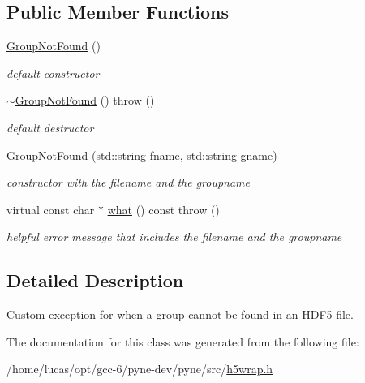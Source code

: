 \subsection*{Public Member Functions}
\begin{DoxyCompactItemize}
\item 
\hyperlink{classh5wrap_1_1_group_not_found_accc7d7bea9e86968335a46ee39d7d543}{Group\+Not\+Found} ()\hypertarget{classh5wrap_1_1_group_not_found_accc7d7bea9e86968335a46ee39d7d543}{}\label{classh5wrap_1_1_group_not_found_accc7d7bea9e86968335a46ee39d7d543}

\begin{DoxyCompactList}\small\item\em default constructor \end{DoxyCompactList}\item 
\hyperlink{classh5wrap_1_1_group_not_found_a79dea7d1d5e3ffd7a7e83b4a2636398a}{$\sim$\+Group\+Not\+Found} ()  throw ()\hypertarget{classh5wrap_1_1_group_not_found_a79dea7d1d5e3ffd7a7e83b4a2636398a}{}\label{classh5wrap_1_1_group_not_found_a79dea7d1d5e3ffd7a7e83b4a2636398a}

\begin{DoxyCompactList}\small\item\em default destructor \end{DoxyCompactList}\item 
\hyperlink{classh5wrap_1_1_group_not_found_a74f7e8f6efcf33503f5fec62eead40c3}{Group\+Not\+Found} (std\+::string fname, std\+::string gname)\hypertarget{classh5wrap_1_1_group_not_found_a74f7e8f6efcf33503f5fec62eead40c3}{}\label{classh5wrap_1_1_group_not_found_a74f7e8f6efcf33503f5fec62eead40c3}

\begin{DoxyCompactList}\small\item\em constructor with the filename and the groupname \end{DoxyCompactList}\item 
virtual const char $\ast$ \hyperlink{classh5wrap_1_1_group_not_found_a76766dc5fda0a07564379db454df87d0}{what} () const   throw ()\hypertarget{classh5wrap_1_1_group_not_found_a76766dc5fda0a07564379db454df87d0}{}\label{classh5wrap_1_1_group_not_found_a76766dc5fda0a07564379db454df87d0}

\begin{DoxyCompactList}\small\item\em helpful error message that includes the filename and the groupname \end{DoxyCompactList}\end{DoxyCompactItemize}


\subsection{Detailed Description}
Custom exception for when a group cannot be found in an H\+D\+F5 file. 

The documentation for this class was generated from the following file\+:\begin{DoxyCompactItemize}
\item 
/home/lucas/opt/gcc-\/6/pyne-\/dev/pyne/src/\hyperlink{h5wrap_8h}{h5wrap.\+h}\end{DoxyCompactItemize}
